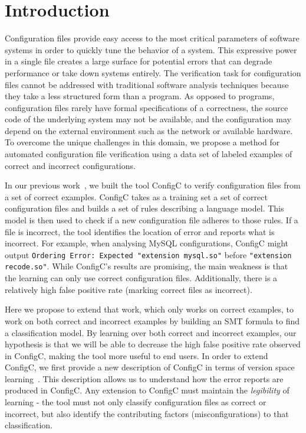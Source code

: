 \section{Introduction}

Configuration files provide easy access to the most critical parameters of software systems in order to quickly tune the behavior of a system.
This expressive power in a single file creates a large surface for potential errors that can degrade performance or take down systems entirely.
The verification task for configuration files cannot be addressed with traditional software analysis techniques because they take a less structured form than a program.
As opposed to programs, configuration files rarely have formal specifications of a correctness, 
  the source code of the underlying system may not be available, 
  and the configuration may depend on the external environment such as the network or available hardware.
To overcome the unique challenges in this domain, we propose a method for automated configuration file verification using a data set of labeled examples of correct and incorrect configurations.

In our previous work~\cite{Santolucito2016}, we built the tool ConfigC to verify configuration files from a set of correct examples.
ConfigC takes as a training set a set of correct configuration files and builds a set of rules describing a language model.
This model is then used to check if a new configuration file adheres to those rules.
If a file is incorrect, the tool identifies the location of error and reports what is incorrect.
For example, when analysing MySQL configurations, ConfigC might output \texttt{Ordering Error: Expected "extension mysql.so"} before \texttt{"extension recode.so"}.
While ConfigC's results are promising, the main weakness is that the learning can only use correct configuration files.
Additionally, there is a relatively high false positive rate (marking correct files as incorrect).

Here we propose to extend that work, which only works on correct examples, to work on both correct and incorrect examples by building an SMT formula to find a classification model.
By learning over both correct and incorrect examples, our hypothesis is that we will be able to decrease the high false positive rate observed in ConfigC, making the tool more useful to end users.
In order to extend ConfigC, we first provide a new description of ConfigC in terms of version space learning~\cite{mitchell82}.
This description allows us to understand how the error reports are produced in ConfigC.
Any extension to ConfigC must maintain the \textit{legibility} of learning - the tool must not only classify configuration files as correct or incorrect, but also identify the contributing factors (misconfigurations) to that classification.

